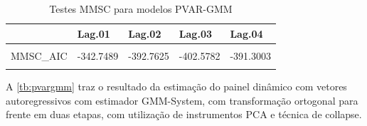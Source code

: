 \documentclass[
  12pt,
  12pt,
  openright,
  oneside,
  a4paper,
  chapter=TITLE,
  section=TITLE,
  subsection=TITLE,
  subsubsection=TITLE,
  english,
  portugues,
  sumario=tradicional]{abntex2}
\begin{document}
\begin{table}[!hbtp]
\caption{Testes MMSC para modelos PVAR-GMM}
\vspace{-1mm}
\begingroup\fontsize{10}{12}\selectfont

\begin{tabu} to 
\toprule
  & Lag.01 & Lag.02 & Lag.03 & Lag.04\\
\midrule
{} &  &  &  & \\
MMSC\_AIC & -342.7489 & -392.7625 & -402.5782 & -391.3003\\
 &  &  &  & \\
\bottomrule
\end{tabu}
\endgroup{}
\vspace{1mm}
\label{tb:mmsc}
\vspace{-2mm}
\end{table}

A \autoref{tb:pvargmm} traz o resultado da estimação do painel dinâmico com vetores autoregressivos com estimador GMM-System, com transformação ortogonal para frente em duas etapas, com utilização de instrumentos PCA e técnica de collapse.

\vspace{20pt}
\vspace{-1mm}
\end{document}
